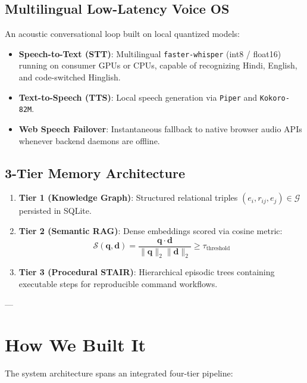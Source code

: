 \documentclass[11pt,a4paper]{article}
\begin{document}
\subsection{Multilingual Low-Latency Voice OS}
An acoustic conversational loop built on local quantized models:
\begin{itemize}
    \item \textbf{Speech-to-Text (STT)}: Multilingual \texttt{faster-whisper} (int8 / float16) running on consumer GPUs or CPUs, capable of recognizing Hindi, English, and code-switched Hinglish.
    \item \textbf{Text-to-Speech (TTS)}: Local speech generation via \texttt{Piper} and \texttt{Kokoro-82M}.
    \item \textbf{Web Speech Failover}: Instantaneous fallback to native browser audio APIs whenever backend daemons are offline.
\end{itemize}

\subsection{3-Tier Memory Architecture}
\begin{enumerate}
    \item \textbf{Tier 1 (Knowledge Graph)}: Structured relational triples $(e_i, r_{ij}, e_j) \in \mathcal{G}$ persisted in SQLite.
    \item \textbf{Tier 2 (Semantic RAG)}: Dense embeddings scored via cosine metric:
    \begin{equation}
    \mathcal{S}(\mathbf{q}, \mathbf{d}) = \frac{\mathbf{q} \cdot \mathbf{d}}{\|\mathbf{q}\|_2 \|\mathbf{d}\|_2} \ge \tau_{\text{threshold}}
    \end{equation}
    \item \textbf{Tier 3 (Procedural STAIR)}: Hierarchical episodic trees containing executable steps for reproducible command workflows.
\end{enumerate}

---

\section{How We Built It}

The system architecture spans an integrated four-tier pipeline:
\end{document}
